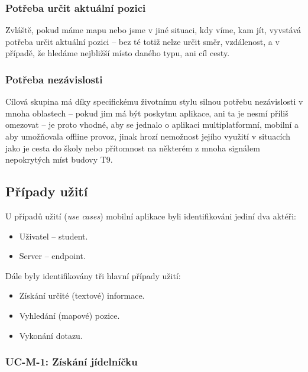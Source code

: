 \subsubsection{Potřeba určit aktuální pozici}
Zvláště, pokud máme mapu nebo jsme v jiné situaci, kdy víme, kam jít, vyvstává potřeba určit aktuální pozici -- bez té totiž nelze určit směr, vzdálenost, a v případě, že hledáme nejbližší místo daného typu, ani cíl cesty.

\subsubsection{Potřeba nezávislosti}
Cílová skupina má díky specifickému životnímu stylu silnou potřebu nezávislosti v mnoha oblastech -- pokud jim má být poskytnu aplikace, ani ta je nesmí příliš omezovat -- je proto vhodné, aby se jednalo o aplikaci multiplatformní, mobilní a aby umožňovala offline provoz, jinak hrozí nemožnost jejího využití v situacích jako je cesta do školy nebo přítomnost na některém z mnoha signálem nepokrytých míst budovy T9.



\subsection{Případy užití}
U případů užití (\textit{use cases}) mobilní aplikace byli identifikováni jediní dva aktéři:
\begin{itemize}
 \item Uživatel -- student.
 \item Server --  endpoint.
\end{itemize}
Dále byly identifikovány tři hlavní případy užití:
\begin{itemize}
 \item Získání určité (textové) informace.
 \item Vyhledání (mapové) pozice.
 \item Vykonání  dotazu.
\end{itemize}

\subsubsection{UC-M-1: Získání jídelníčku}
